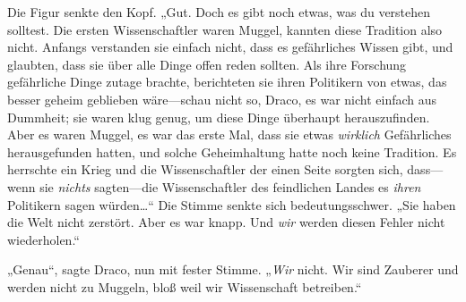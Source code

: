 Die Figur senkte den Kopf. „Gut. Doch es gibt noch etwas, was du verstehen solltest. Die ersten Wissenschaftler waren Muggel, kannten diese Tradition also nicht. Anfangs verstanden sie einfach nicht, dass es gefährliches Wissen gibt, und glaubten, dass sie über alle Dinge offen reden sollten. Als ihre Forschung gefährliche Dinge zutage brachte, berichteten sie ihren Politikern von etwas, das besser geheim geblieben wäre—schau nicht so, Draco, es war nicht einfach aus Dummheit; sie waren klug genug, um diese Dinge überhaupt herauszufinden. Aber es waren Muggel, es war das erste Mal, dass sie etwas \emph{wirklich} Gefährliches herausgefunden hatten, und solche Geheimhaltung hatte noch keine Tradition. Es herrschte ein Krieg und die Wissenschaftler der einen Seite sorgten sich, dass—wenn sie \emph{nichts} sagten—die Wissenschaftler des feindlichen Landes es \emph{ihren} Politikern sagen würden…“ Die Stimme senkte sich bedeutungsschwer. „Sie haben die Welt nicht zerstört. Aber es war knapp. Und \emph{wir} werden diesen Fehler nicht wiederholen.“

„Genau“, sagte Draco, nun mit fester Stimme. „\emph{Wir} nicht. Wir sind Zauberer und werden nicht zu Muggeln, bloß weil wir Wissenschaft betreiben.“

